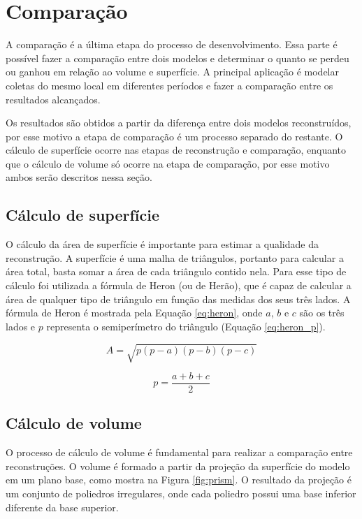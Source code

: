 \section{Comparação}
\label{sec:comparacao}

A comparação é a última etapa do processo de desenvolvimento. 
Essa parte é possível fazer a comparação entre dois modelos e determinar o quanto se perdeu ou ganhou em relação ao volume e superfície. 
A principal aplicação é modelar coletas do mesmo local em diferentes períodos e fazer a comparação entre os resultados alcançados.

Os resultados são obtidos a partir da diferença entre dois modelos reconstruídos, por esse motivo a etapa de comparação é um processo separado do restante. 
O cálculo de superfície ocorre nas etapas de reconstrução e comparação, enquanto que o cálculo de volume só ocorre na etapa de comparação, por esse motivo ambos serão descritos nessa seção.

\subsection{Cálculo de superfície}
\label{sec:surface_calc}

O cálculo da área de superfície é importante para estimar a qualidade da reconstrução.
A superfície é uma malha de triângulos, portanto para calcular a área total, basta somar a área de cada triângulo contido nela. 
Para esse tipo de cálculo foi utilizada a fórmula de Heron (ou de Herão), que é capaz de calcular a área de qualquer tipo de triângulo em função das medidas dos seus três lados.
A fórmula de Heron é mostrada pela Equação \ref{eq:heron}, onde $a$, $b$ e $c$ são os três lados e $p$ representa o semiperímetro do triângulo (Equação \ref{eq:heron_p}).

\begin{equation}
    \label{eq:heron}
    A = \sqrt{p(p-a)(p-b)(p-c)}
\end{equation}

\begin{equation}
    \label{eq:heron_p}
    p = \frac{a+b+c}{2}
\end{equation}


\subsection{Cálculo de volume}
\label{sec:volume_calc}

O processo de cálculo de volume é fundamental para realizar a comparação entre reconstruções.
O volume é formado a partir da projeção da superfície do modelo em um plano base, como mostra na Figura \ref{fig:prism}.
O resultado da projeção é um conjunto de poliedros irregulares, onde cada poliedro possui uma base inferior diferente da base superior.


